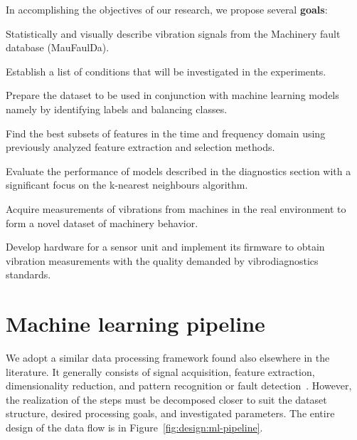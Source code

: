 \noindent In accomplishing the objectives of our research, we propose several \textbf{goals}:
\begin{todolist}
    \itemsep0pt
    \item Statistically and visually describe vibration signals from the Machinery fault database (MauFaulDa).
    \item Establish a list of conditions that will be investigated in the experiments.
    \item Prepare the dataset to be used in conjunction with machine learning models namely by identifying labels and balancing classes.
    \item Find the best subsets of features in the time and frequency domain using previously analyzed feature extraction and selection methods.
    \item Evaluate the performance of models described in the diagnostics section with a significant focus on the k-nearest neighbours algorithm.
    \item Acquire measurements of vibrations from machines in the real environment to form a novel dataset of machinery behavior.
    \item Develop hardware for a sensor unit and implement its firmware to obtain vibration measurements with the quality demanded by vibrodiagnostics standards.
\end{todolist}

\section{Machine learning pipeline}
We adopt a similar data processing framework found also elsewhere in the literature. It generally consists of signal acquisition, feature extraction, dimensionality reduction, and pattern recognition or fault detection~\cite{wang_bearing_2015}. However, the realization of the steps must be decomposed closer to suit the dataset structure, desired processing goals, and investigated parameters. The entire design of the data flow is in Figure~\ref{fig:design:ml-pipeline}.

